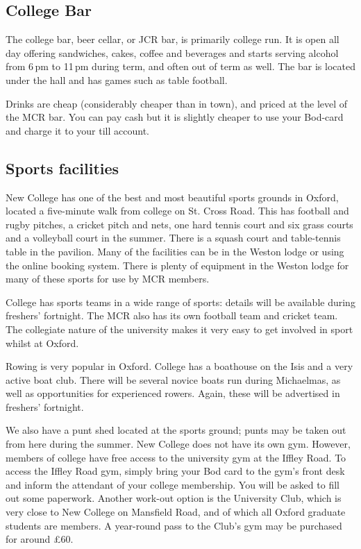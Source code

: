 \subsection{College Bar}
The college bar, beer cellar, or JCR bar, is primarily college run. It is open
all day offering sandwiches, cakes, coffee and beverages and starts serving
alcohol from 6\,pm to 11\,pm during term, and often out of term as well. The bar
is located under the hall and has games such as table football.

Drinks are cheap (considerably cheaper than in town), and priced at the
level of the MCR bar. You can pay cash but it is slightly cheaper to use your Bod-card and charge it to your till account.

\subsection{Sports facilities}
New College has one of the best and most beautiful sports grounds in Oxford, located a five-minute walk from college on St. Cross Road. This has football and rugby pitches, a cricket pitch and nets, one hard tennis court and six grass courts and a volleyball court in the summer. There is a squash court and table-tennis table in the pavilion. Many of the facilities can be in the Weston lodge or using the online booking system. There is plenty of equipment in the Weston lodge for many of these sports for use by MCR members. 

College has sports teams in a wide range of sports: details will be available during freshers' fortnight. The MCR also has its own football team and cricket team. The collegiate nature of the university makes it very easy to get involved in sport whilst at Oxford.

Rowing is very popular in Oxford. College has a boathouse on the Isis and a very active boat club. There will be several novice boats run during Michaelmas, as well as opportunities for experienced rowers. Again, these will be advertised in freshers' fortnight.

We also have a punt shed located at the sports ground; punts may be taken out
from here during the summer. New College does not have its own gym. However,
members of college have free access to the university gym at the Iffley Road. To
access the Iffley Road gym, simply bring your Bod card to the gym's front desk
and inform the attendant of your college membership. You will be asked to fill
out some paperwork. Another work-out option is the University Club, which is
very close to New College on Mansfield Road, and of which all Oxford graduate
students are members. A year-round pass to the Club's gym may be purchased for
around \pounds60.

